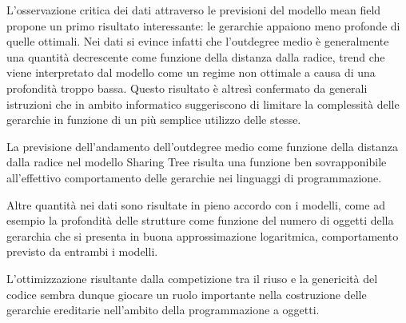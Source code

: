 \documentclass[12pt, a4paper, oneside]{book}
\begin{document}
\vspace{0.3cm}
L'osservazione critica dei dati attraverso le previsioni del modello mean field propone un primo risultato interessante: le gerarchie appaiono meno profonde di quelle ottimali. Nei dati si evince infatti che l'outdegree medio è generalmente una quantità decrescente come funzione della distanza dalla radice, trend che viene interpretato dal modello come un regime non ottimale a causa di una profondità troppo bassa. Questo risultato è altresì confermato da generali istruzioni che in ambito informatico suggeriscono di limitare la complessità delle gerarchie in funzione di un più semplice utilizzo delle stesse.

La previsione dell'andamento dell'outdegree medio come funzione della distanza dalla radice nel modello Sharing Tree risulta una funzione ben sovrapponibile all'effettivo comportamento delle gerarchie nei linguaggi di programmazione.

Altre quantità nei dati sono risultate in pieno accordo con i modelli, come ad esempio la profondità delle strutture come funzione del numero di oggetti della gerarchia che si presenta in buona approssimazione logaritmica, comportamento previsto da entrambi i modelli.

\vspace{0.3cm}
L'ottimizzazione risultante dalla competizione tra il riuso e la genericità del codice sembra dunque giocare un ruolo importante nella costruzione delle gerarchie ereditarie nell'ambito della programmazione a oggetti.
\end{document}
